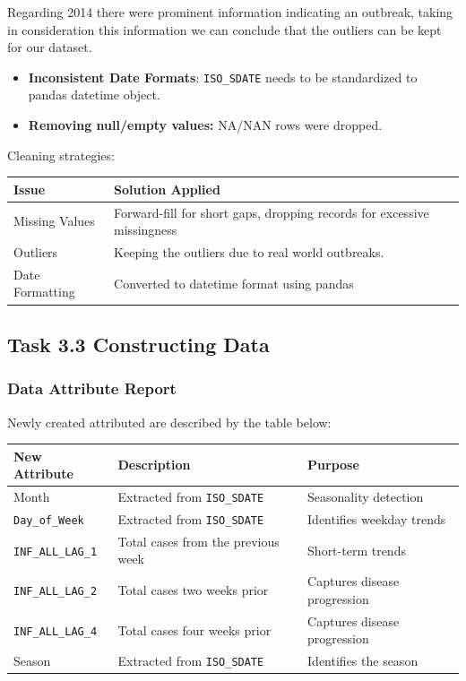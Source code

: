 Regarding 2014 there were prominent information indicating an outbreak, taking in consideration this information we can conclude that the outliers can be kept for our dataset.
\begin{itemize}
  \item \textbf{Inconsistent Date Formats}: \texttt{ISO\_SDATE} needs to be standardized to pandas datetime object.
  \item \textbf{Removing null/empty values:} NA/NAN rows were dropped.
\end{itemize}

Cleaning strategies:

\begin{longtable}{|>{\raggedright\arraybackslash}p{4cm}|>{\raggedright\arraybackslash}p{8cm}|}
\hline
Issue & Solution Applied \\
\hline
\endhead
\hline
Missing Values & Forward-fill for short gaps, dropping records for excessive missingness \\
\hline
Outliers & Keeping the outliers due to real world outbreaks. \\
\hline
Date Formatting & Converted to datetime format using pandas \\
\hline
\end{longtable}

\subsection*{Task 3.3 Constructing Data}

\subsubsection*{Data Attribute Report}

Newly created attributed are described by the table below:

\begin{longtable}{|>{\raggedright\arraybackslash}p{3cm}|>{\raggedright\arraybackslash}p{5cm}|>{\raggedright\arraybackslash}p{4cm}|}
\hline
New Attribute & Description & Purpose \\
\hline
\endhead
\hline
Month & Extracted from \texttt{ISO\_SDATE} & Seasonality detection \\
\hline
\texttt{Day\_of\_Week} & Extracted from \texttt{ISO\_SDATE} & Identifies weekday trends \\
\hline
\texttt{INF\_ALL\_LAG\_1} & Total cases from the previous week & Short-term trends \\
\hline
\texttt{INF\_ALL\_LAG\_2} & Total cases two weeks prior & Captures disease progression \\
\hline
\texttt{INF\_ALL\_LAG\_4} & Total cases four weeks prior & Captures disease progression \\
\hline
Season & Extracted from \texttt{ISO\_SDATE} & Identifies the season \\
\hline
\end{longtable}

